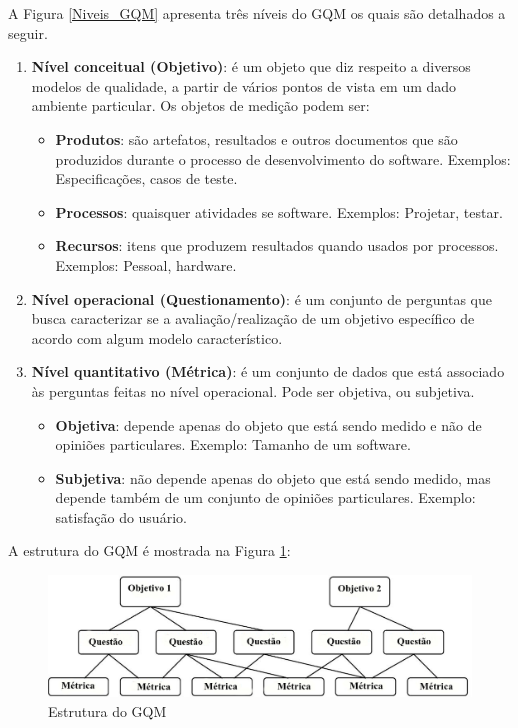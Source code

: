 A Figura \ref{Niveis_GQM} apresenta três níveis do GQM os quais são detalhados a seguir.

\begin{enumerate}
 \item \textbf{Nível conceitual (Objetivo)}: é um objeto que diz respeito a diversos modelos de qualidade, a partir de vários pontos de vista em um dado ambiente particular. Os objetos de medição podem ser:
 
\begin{itemize}
\item \textbf{Produtos}: são artefatos, resultados e outros documentos que são produzidos durante o processo de desenvolvimento do software. Exemplos: Especificações, casos de teste.

\item \textbf{Processos}: quaisquer atividades se software. Exemplos: Projetar, testar.

\item \textbf{Recursos}: itens que produzem resultados quando usados por processos. Exemplos: Pessoal, hardware.
\end{itemize}

\item \textbf{Nível operacional (Questionamento)}: é um conjunto de perguntas que busca caracterizar se a avaliação/realização de um objetivo específico de acordo com algum modelo característico.

\item \textbf{Nível quantitativo (Métrica)}: é  um conjunto de dados que está associado às perguntas feitas no nível operacional. Pode ser objetiva, ou subjetiva.

\begin{itemize}
\item \textbf{Objetiva}: depende apenas do objeto que está sendo medido e não de opiniões particulares. Exemplo: Tamanho de um software.
\item \textbf{Subjetiva}: não depende apenas do objeto que está sendo medido, mas depende também de um conjunto de opiniões particulares. Exemplo: satisfação do usuário.
\end{itemize}

\end{enumerate}

A estrutura do GQM é mostrada na Figura \ref{Estrutura_GQM}:

\begin{figure}[h]
\centering
\includegraphics[keepaspectratio=true,scale=0.4]{figuras/GQM_Estrutura.jpg}
\caption{Estrutura do GQM \cite{Basili}}
\label{Estrutura_GQM}
\end{figure}

